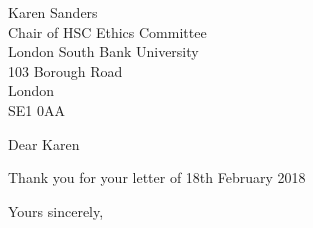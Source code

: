 \documentclass
[
	12pt,
	a4paper,
	oneside
]{letter}
\begin{document}
\begin{letter}{Karen Sanders\\
		Chair of HSC Ethics Committee\\
		London South Bank University\\
		103 Borough Road\\
		London\\
		SE1 0AA}
\opening{Dear Karen}

Thank you for your letter of 18th February 2018
\closing{Yours sincerely,}


\end{letter}
\end{document}
